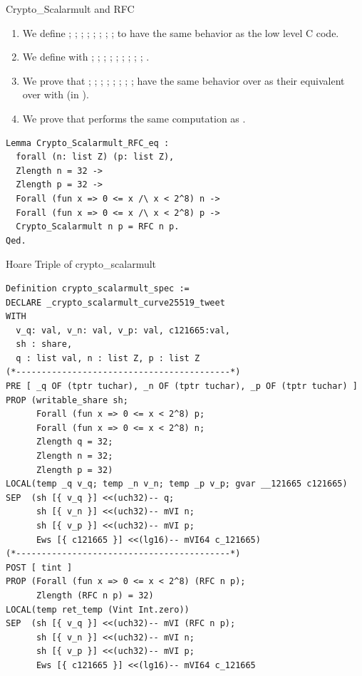 \documentclass[8pt,aspectratio=169]{beamer}
\begin{document}
%
%
\begin{frame}[fragile]{Crypto\_Scalarmult and RFC}

	\begin{enumerate}
		\item We define ; ; ; ; ; ; ;
		      ;  to have the same behavior as the low level C code.
		\item We define  with ; ; ; ; ; ; ;
		      ; ; .
		\item We prove that ; ; ; ;
		      ; ; ; ;  have the same behavior over 
		      as their equivalent over  with  (in \Zfield).
		\item We prove that  performs the same computation as .
	\end{enumerate}

	\begin{lstlisting}[language=Coq, basicstyle=\normalsize]
Lemma Crypto_Scalarmult_RFC_eq :
  forall (n: list Z) (p: list Z),
  Zlength n = 32 ->
  Zlength p = 32 ->
  Forall (fun x => 0 <= x /\ x < 2^8) n ->
  Forall (fun x => 0 <= x /\ x < 2^8) p ->
  Crypto_Scalarmult n p = RFC n p.
Qed.
\end{lstlisting}

\end{frame}


%
%
\begin{frame}[fragile]{Hoare Triple of crypto\_scalarmult}
	\begin{lstlisting}[language=CoqVST]
Definition crypto_scalarmult_spec :=
DECLARE _crypto_scalarmult_curve25519_tweet
WITH
  v_q: val, v_n: val, v_p: val, c121665:val,
  sh : share,
  q : list val, n : list Z, p : list Z
(*------------------------------------------*)
PRE [ _q OF (tptr tuchar), _n OF (tptr tuchar), _p OF (tptr tuchar) ]
PROP (writable_share sh;
      Forall (fun x => 0 <= x < 2^8) p;
      Forall (fun x => 0 <= x < 2^8) n;
      Zlength q = 32;
      Zlength n = 32;
      Zlength p = 32)
LOCAL(temp _q v_q; temp _n v_n; temp _p v_p; gvar __121665 c121665)
SEP  (sh [{ v_q }] <<(uch32)-- q;
      sh [{ v_n }] <<(uch32)-- mVI n;
      sh [{ v_p }] <<(uch32)-- mVI p;
      Ews [{ c121665 }] <<(lg16)-- mVI64 c_121665)
(*------------------------------------------*)
POST [ tint ]
PROP (Forall (fun x => 0 <= x < 2^8) (RFC n p);
      Zlength (RFC n p) = 32)
LOCAL(temp ret_temp (Vint Int.zero))
SEP  (sh [{ v_q }] <<(uch32)-- mVI (RFC n p);
      sh [{ v_n }] <<(uch32)-- mVI n;
      sh [{ v_p }] <<(uch32)-- mVI p;
      Ews [{ c121665 }] <<(lg16)-- mVI64 c_121665
\end{lstlisting}
\end{frame}
\end{document}
